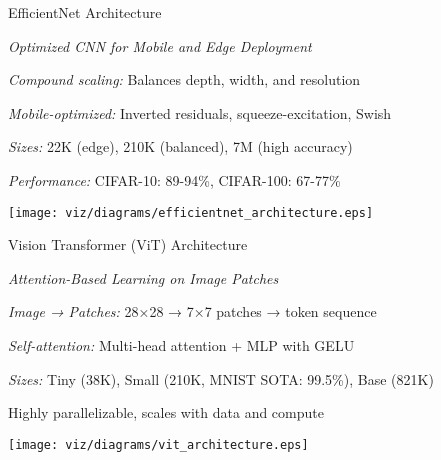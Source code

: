 \begin{slide}[\slideopts,toc={EfficientNet}]{EfficientNet Architecture}
  
  \emph{Optimized CNN for Mobile and Edge Deployment}
  
  \begin{itemize}
    \mpitem \emph{Compound scaling:} Balances depth, width, and resolution
    
    \mpitem \emph{Mobile-optimized:} Inverted residuals, squeeze-excitation, Swish
    
    \mpitem \emph{Sizes:} 22K (edge), 210K (balanced), 7M (high accuracy)
    
    \mpitem \emph{Performance:} CIFAR-10: 89-94\%, CIFAR-100: 67-77\%
  \end{itemize}
  
  \vspace{0.5em}
  \centerline{\texttt{[image: viz/diagrams/efficientnet\_architecture.eps]}}
\end{slide}

\begin{slide}[\slideopts,toc={ViT}]{Vision Transformer (ViT) Architecture}
  
  \emph{Attention-Based Learning on Image Patches}
  
  \begin{itemize}
    \mpitem \emph{Image → Patches:} 28×28 → 7×7 patches → token sequence
    
    \mpitem \emph{Self-attention:} Multi-head attention + MLP with GELU
    
    \mpitem \emph{Sizes:} Tiny (38K), Small (210K, MNIST SOTA: 99.5\%), Base (821K)
    
    \mpitem Highly parallelizable, scales with data and compute
  \end{itemize}
  
  \vspace{0.5em}
  \centerline{\texttt{[image: viz/diagrams/vit\_architecture.eps]}}
\end{slide}


